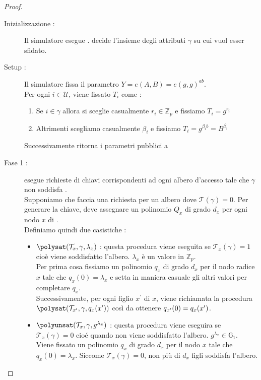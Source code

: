 \begin{thm}
\begin{proof}
\begin{description}
\item[Inizializzazione :] Il simulatore  esegue .  decide l'insieme degli attributi $\gamma$ su cui vuol esser sfidato.
\item[Setup :] Il simulatore  fissa il parametro $Y= e(A,B) = e(g,g)^{ab}$.\\
Per ogni $i \in \mathcal{U}$, viene fissato $T_i$ come :
\begin{enumerate}
\item Se $i \in \gamma$ allora si sceglie casualmente $r_i \in \mathbb{Z}_p$ e fissiamo $T_i = g^{r_i}$
\item Altrimenti scegliamo casualmente $\beta_i$ e fissiamo $T_i = g^{\beta_i b} = B^{\beta_i}$
\end{enumerate}
Successivamente  ritorna i parametri pubblici a 
\item[Fase 1 :]  esegue richieste di chiavi corrispondenti ad ogni albero d'accesso  tale che $\gamma$ non soddisfa .\\
Supponiamo che  faccia una richiesta per un albero  dove $\mathcal{T}(\gamma) = 0$. Per generare la chiave,  deve assegnare un polinomio $Q_x$ di grado $d_x$ per ogni nodo $x$ di .\\
Definiamo quindi due casistiche :
\begin{itemize}
\item $\polysat (\mathcal{T}_x , \gamma, \lambda_x )$ : questa procedura viene eseguita se $\mathcal{T}_x(\gamma) = 1$ cioè viene soddisfatto l'albero. $\lambda_x$ è un valore in $\mathbb{Z}_p$.\\
Per prima cosa fissiamo un polinomio $q_x$ di grado $d_x$ per il nodo radice $x$ tale che $q_x(0) = \lambda_x$ e setta in maniera casuale gli altri valori per completare $q_x$.\\
Successivamente, per ogni figlio $x^\prime$ di $x$, viene richiamata la procedura $\polysat(\mathcal{T}_{x^\prime}, \gamma, q_x(\index(x^\prime))$ così da ottenere $q_{x^\prime} (0) = q_x (\index(x^\prime)$.
\item $\polyunsat(\mathcal{T}_x, \gamma , g^{\lambda_x})$ : questa procedura viene eseguira se $\mathcal{T}_x (\gamma) = 0$ cioé quando non viene soddisfatto l'albero. $g^{\lambda_x} \in \mathbb{G}_1$.\\
Viene fissato un polinomio $q_x$ di grado $d_x$ per il nodo $x$ tale che $q_x(0) = \lambda_x$. Siccome $\mathcal{T}_x(\gamma) = 0$, non più di $d_x$ figli soddisfa l'albero.\\

\end{itemize}
\end{description}
\end{proof}
\end{thm}
